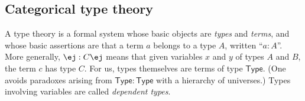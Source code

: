 \documentclass[copyright,12pt]{eptcs}
\makeatletter
\newcommand{\type}{\ensuremath{\mathsf{Type}}\xspace}
\def\jd#1{\@jd#1\ej}
\def\@jd#1|-#2\ej{\@@jd#1,,\;\vdash\;\left(#2\right)}
\def\@@jd#1,{\@ifmtarg{#1}{\let\next=\relax}{\left(#1\right)\let\next=\@@@jd}\next}
\def\@@@jd#1,{\@ifmtarg{#1}{\let\next=\relax}{,\,\left(#1\right)\let\next=\@@@jd}\next}
\makeatother
\begin{document}
\subsection{Categorical type theory}
\label{sec:type-theory}

A type theory is a formal system
whose basic objects are \emph{types} and \emph{terms},
and whose basic assertions are that a term $a$ belongs to a type $A$, written ``$a:A$''.
%
More generally, $\jd{x:A, y:B |- c:C}$ means that given variables $x$ and $y$ of types $A$ and $B$, the term $c$ has type $C$.
%
For us,
types themselves are terms of type \type.
(One avoids paradoxes arising from $\type:\type$ with a hierarchy of universes.)
%
%
Types involving variables are called \emph{dependent types}.
\end{document}
